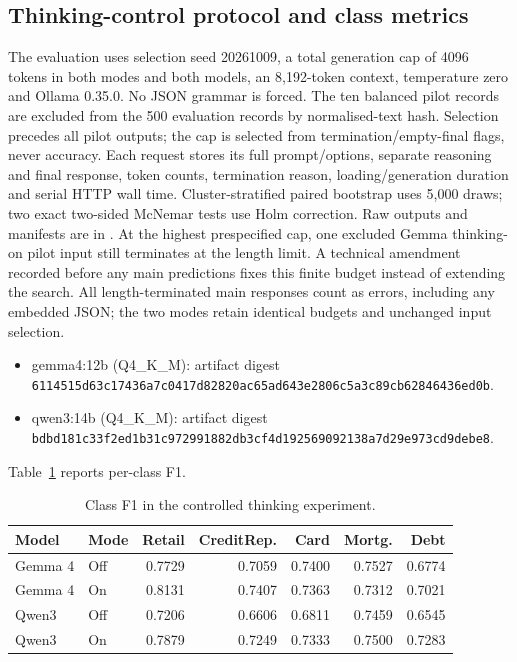 \subsection{Thinking-control protocol and class metrics}
\label{sec:thinking_protocol}
The evaluation uses selection seed 20261009, a total generation cap of 4096 tokens
in both modes and both models, an 8,192-token context, temperature zero
and Ollama 0.35.0. No JSON grammar is forced.
The ten balanced pilot records are excluded from the 500 evaluation
records by normalised-text hash. Selection precedes all pilot outputs;
the cap is selected from termination/empty-final flags, never accuracy.
Each request stores its full prompt/options, separate reasoning and final
response, token counts, termination reason, loading/generation duration
and serial HTTP wall time. Cluster-stratified paired bootstrap uses
5,000 draws; two exact two-sided McNemar tests use Holm correction.
Raw outputs and manifests are in
.
At the highest prespecified cap, one excluded Gemma thinking-on
pilot input still terminates at the length limit. A technical
amendment recorded before any main predictions fixes this finite
budget instead of extending the search. All length-terminated main
responses count as errors, including any embedded JSON; the two modes
retain identical budgets and unchanged input selection.
\begin{itemize}
\item gemma4:12b (Q4\_K\_M): artifact digest \newline\texttt{6114515d63c17436a7c0417d82820ac65ad643e2806c5a3c89cb62846436ed0b}.
\item qwen3:14b (Q4\_K\_M): artifact digest \newline\texttt{bdbd181c33f2ed1b31c972991882db3cf4d192569092138a7d29e973cd9debe8}.
\end{itemize}
Table~\ref{tab:thinking_class} reports per-class F1.
\begin{table}[tb]\centering\small
\caption{Class F1 in the controlled thinking experiment.}
\label{tab:thinking_class}
\begin{tabular}{llrrrrr}\toprule
Model & Mode & Retail & CreditRep. & Card & Mortg. & Debt \\\midrule
Gemma 4 & Off & 0.7729 & 0.7059 & 0.7400 & 0.7527 & 0.6774 \\
Gemma 4 & On & 0.8131 & 0.7407 & 0.7363 & 0.7312 & 0.7021 \\
Qwen3 & Off & 0.7206 & 0.6606 & 0.6811 & 0.7459 & 0.6545 \\
Qwen3 & On & 0.7879 & 0.7249 & 0.7333 & 0.7500 & 0.7283 \\
\bottomrule\end{tabular}\end{table}
